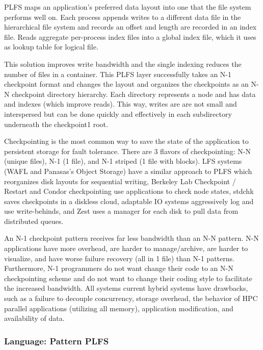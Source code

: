 PLFS maps an application's preferred data layout into one that the file system
performs well on. Each process appends writes to a different data file in the
hierarchical file system and records an offset and length are recorded in an
index file. Reads aggregate per-process index files into a global index file,
which it uses as lookup table for logical file. 

This solution improves write bandwidth and the single indexing reduces the
number of files in a container. This PLFS layer successfully takes an N-1
checkpoint format and changes the layout and organizes the checkpoints as an
N-N checkpoint directory hierarchy. Each directory represents a node and has
data and indexes (which improve reads). This way, writes are are not small and
interspersed but can be done quickly and effectively in each subdirectory
underneath the checkpoint1 root.

Checkpointing is the most common way to save the state of the application to
persistent storage for fault tolerance. There are 3 flavors of checkpointing:
N-N (unique files), N-1 (1 file), and N-1 striped (1 file with blocks). LFS
systems (WAFL and Panasas's Object Storage) have a similar approach to PLFS
which reorganizes disk layouts for sequential writing, Berkeley Lab Checkpoint
/ Restart and Condor checkpointing use applications to check node states,
stdchk saves checkpoints in a  diskless cloud, adaptable IO systems
aggressively log and use write-behinds, and Zest uses a manager for each disk
to pull data from distributed queues.

An N-1 checkpoint pattern receives far less bandwidth than an N-N pattern. N-N
applications have more overhead, are harder to manage/archive, are harder to
visualize, and have worse failure recovery (all in 1 file) than N-1 patterns.
Furthermore, N-1 programmers do not want change their code to an N-N
checkpointing scheme and do not want to change their coding style to facilitate
the increased bandwidth. All systems current hybrid systems have drawbacks,
such as a failure to decouple concurrency, storage overhead, the behavior of
HPC parallel applications (utilizing all memory), application modification, and
availability of data.

\subsubsection{Language: Pattern PLFS}
\label{sec:language-patterned-io}

